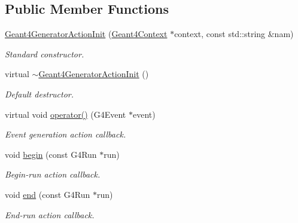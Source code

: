 \subsection*{Public Member Functions}
\begin{DoxyCompactItemize}
\item 
\hyperlink{class_d_d4hep_1_1_simulation_1_1_geant4_generator_action_init_a33f6258e3b8c24b7ccc09ee2a107e6d7}{Geant4GeneratorActionInit} (\hyperlink{class_d_d4hep_1_1_simulation_1_1_geant4_context}{Geant4Context} $\ast$context, const std::string \&nam)
\begin{DoxyCompactList}\small\item\em Standard constructor. \item\end{DoxyCompactList}\item 
virtual \hyperlink{class_d_d4hep_1_1_simulation_1_1_geant4_generator_action_init_a8e406b069d1024eb9891cbb979c5a734}{$\sim$Geant4GeneratorActionInit} ()
\begin{DoxyCompactList}\small\item\em Default destructor. \item\end{DoxyCompactList}\item 
virtual void \hyperlink{class_d_d4hep_1_1_simulation_1_1_geant4_generator_action_init_adbcf087dfc4c0ac510b102dfd1f838b0}{operator()} (G4Event $\ast$event)
\begin{DoxyCompactList}\small\item\em Event generation action callback. \item\end{DoxyCompactList}\item 
void \hyperlink{class_d_d4hep_1_1_simulation_1_1_geant4_generator_action_init_a7f4d99a8f94977444775eabea8080868}{begin} (const G4Run $\ast$run)
\begin{DoxyCompactList}\small\item\em Begin-\/run action callback. \item\end{DoxyCompactList}\item 
void \hyperlink{class_d_d4hep_1_1_simulation_1_1_geant4_generator_action_init_aa3b0b224ed839f32af03507be13267a8}{end} (const G4Run $\ast$run)
\begin{DoxyCompactList}\small\item\em End-\/run action callback. \item\end{DoxyCompactList}\end{DoxyCompactItemize}
